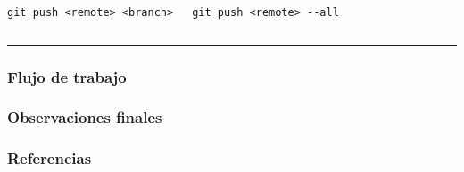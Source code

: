 \documentclass{beamer}
\newcommand\crule[3][black]{\textcolor{#1}{\rule{#2}{#3}}}
\begin{document}
\begin{frame}
  \begin{columns}
    \resizebox{\textwidth}{!}{\FiraTitle \color{green}{Push}}
    \vspace{1em}
    
    {\FiraTitle \lstinline|git push <remote> <branch>|}

    {\FiraTitle \lstinline|git push <remote> --all|}

    {\FiraTitle \color{red}{\lstinline|git push <remote> --force|}}
  \end{columns}
  \vspace{2em}

  \crule[green]{1.2\textwidth}{3em}
\end{frame}

\begin{frame}
\frametitle{Flujo de trabajo}
\end{frame}

\begin{frame}
\frametitle{Observaciones finales}
\end{frame}

\begin{frame}
  \frametitle{Referencias}
\end{frame}
\end{document}
